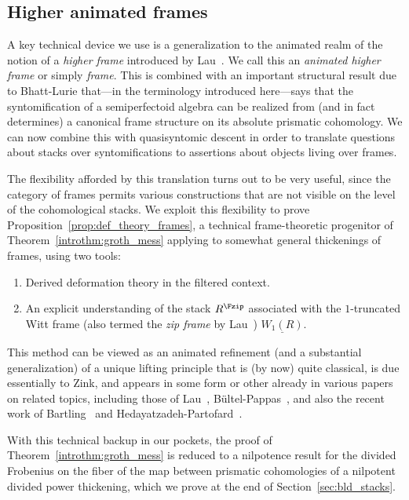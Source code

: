 \documentclass[10pt]{amsart}
\begin{document}
\subsection{Higher animated frames}
A key technical device we use is a generalization to the animated realm of the notion of a \emph{higher frame} introduced by Lau~\cite{MR4355476}. We call this an \emph{animated higher frame} or simply \emph{frame}. This is combined with an important structural result due to Bhatt-Lurie that---in the terminology introduced here---says that the syntomification of a semiperfectoid algebra can be realized from (and in fact determines) a canonical frame structure on its absolute prismatic cohomology. We can now combine this with quasisyntomic descent in order to translate questions about stacks over syntomifications to assertions about objects living over frames.

The flexibility afforded by this translation turns out to be very useful, since the category of frames permits various constructions that are not visible on the level of the cohomological stacks. We exploit this flexibility to prove Proposition~\ref{prop:def_theory_frames}, a technical frame-theoretic progenitor of Theorem~\ref{introthm:groth_mess} applying to somewhat general thickenings of frames, using two tools:
\begin{enumerate}
   \item Derived deformation theory in the filtered context.
   \item An explicit understanding of the stack $R^{\Fzip}$ associated with the $1$-truncated Witt frame (also termed the \emph{zip frame} by Lau~\cite{MR4355476}) $\underline{W_1(R)}$.
\end{enumerate}
This method can be viewed as an animated refinement (and a substantial generalization) of a unique lifting principle that is (by now) quite classical, is due essentially to Zink, and appears in some form or other already in various papers on related topics, including those of Lau~\cite{MR4355476}, B\"ultel-Pappas~\cite{MR4120808}, and also the recent work of Bartling~\cite{bartling2022mathcalgmudisplayslocalshtuka} and Hedayatzadeh-Partofard~\cite{hedayatzadeh_partofard}. 


With this technical backup in our pockets, the proof of Theorem~\ref{introthm:groth_mess} is reduced to a nilpotence result for the divided Frobenius on the fiber of the map between prismatic cohomologies of a nilpotent divided power thickening, which we prove at the end of Section~\ref{sec:bld_stacks}. 
\end{document}
